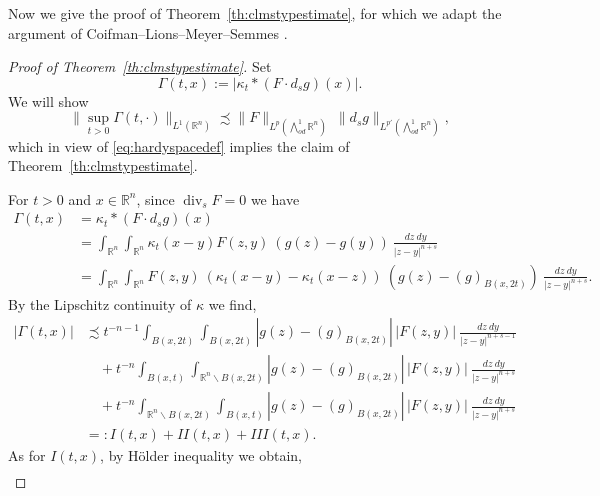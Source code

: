 \documentclass[12pt]{amsart}
\theoremstyle{definition}
\newcommand{\R}{\mathbb{R}}
\newcommand{\brac}[1]{\left (#1 \right )}
\newcommand{\Ep}{\bigwedge\nolimits}
\numberwithin{theorem}{section} \numberwithin{equation}{section}
\renewcommand{\div}{\operatorname{div}}
\newcommand{\aleq}{\precsim}
\begin{document}
Now we give the proof of Theorem~\ref{th:clmstypestimate}, for which we adapt the argument of Coifman--Lions--Meyer--Semmes \cite[Lemma II.1]{CLMS-1993}.
\begin{proof}[Proof of Theorem~\ref{th:clmstypestimate}]
Set 
\[
 \Gamma(t,x) :=  |\kappa_t \ast (F \cdot d_s g)(x)|.
\]
% 
We will show
\begin{equation}\label{eq:clmshardyestclaim}
\| \sup_{t > 0} \Gamma(t,\cdot)\|_{L^1(\R^n)} \aleq  \|F\|_{L^p(\Ep^1_{od} \R^n)}\ \|d_s g\|_{L^{p'}(\Ep^1_{od} \R^n)},
\end{equation}
which in view of \eqref{eq:hardyspacedef} implies the claim of Theorem~\ref{th:clmstypestimate}. 

For $t > 0$ and $x \in \R^n$, since $\div_s F = 0$ we have
\[
\begin{split}
 \Gamma(t,x)&= \kappa_t \ast (F \cdot d_s g)(x)\\
&=\int_{\R^n}\int_{\R^n} \kappa_t(x-y) F(z,y)\ (g(z)-g(y))\ \frac{dz\ dy}{|z-y|^{n+s}}\\
&=
\int_{\R^n}\int_{\R^n} F(z,y)\ \brac{\kappa_t(x-y)-\kappa_t(x-z)}\ (g(z)-(g)_{B(x,2t)})\ \frac{dz\ dy}{|z-y|^{n+s}}.
\end{split}
 \]
By the Lipschitz continuity of $\kappa$ we find,
\begin{equation}\label{eq:splitclms}
\begin{split}
 |\Gamma(t,x)|  &\aleq t^{-n-1} \int_{B(x,2t)}\int_{B(x,2t)} |g(z)-(g)_{B(x,2t)}|\,  |F(z,y)|\ \frac{dz\ dy}{|z-y|^{n+s-1}}\\
&\quad+t^{-n} \int_{B(x,t)}\int_{\R^n \backslash B(x,2t)} |g(z)-(g)_{B(x,2t)}|\,  |F(z,y)|\ \frac{dz\ dy}{|z-y|^{n+s}}\\
 &\quad+t^{-n} \int_{\R^n \backslash B(x,2t)} \int_{B(x,t)}|g(z)-(g)_{B(x,2t)}|\,  |F(z,y)|\ \frac{dz\ dy}{|z-y|^{n+s}}\\
&=: I(t,x) + II(t,x) +III(t,x).
 \end{split}
\end{equation}
As for $I(t,x)$, by H\"{o}lder inequality we obtain,
\[
\begin{split}

\end{split}\]
\end{proof}
\end{document}
